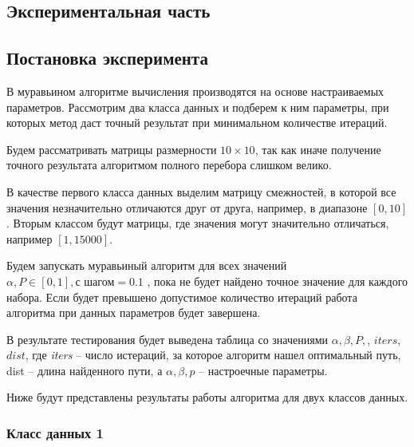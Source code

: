 \documentclass[a4paper,12pt]{article}
\begin{document}
    \begin{center}
        \section{Экспериментальная часть}        
	\end{center}
	
			\subsection{Постановка эксперимента}
			
			
			В муравьином алгоритме вычисления производятся на основе настраиваемых параметров.  Рассмотрим два класса данных и подберем к ним параметры, при которых метод даст точный результат при минимальном количестве итераций. 
			
			Будем рассматривать матрицы размерности $ 10 \times 10 $, так как иначе получение точного результата алгоритмом полного перебора слишком велико. 
			
			В качестве первого класса данных выделим матрицу смежностей, в которой все значения незначительно отличаются друг от друга, например, в диапазоне $ [0, 10] $. Вторым классом будут матрицы, где значения могут значительно отличаться, например $ [1, 15000] $. 
			
			Будем запускать муравьиный алгоритм для всех значений $ \alpha, P \in [0, 1], \textrm{с шагом}=0.1 $ , пока не будет найдено точное значение для каждого набора. Если будет превышено допустимое количество итераций работа алгоритма при данных параметров будет завершена. 
			
			В результате тестирования будет выведена таблица со значениями $ \alpha, \beta, P, $,  $iters$, $ dist $, где \textit{iters} -- число истераций, за которое алгоритм нашел оптимальный путь, dist -- длина найденного пути, а $ \alpha, \beta, p $ -- настроечные параметры. 			
			
		    Ниже будут представлены результаты работы алгоритма для двух классов данных. 
		    
		    \subsubsection{Класс данных 1}
		    
\end{document}
